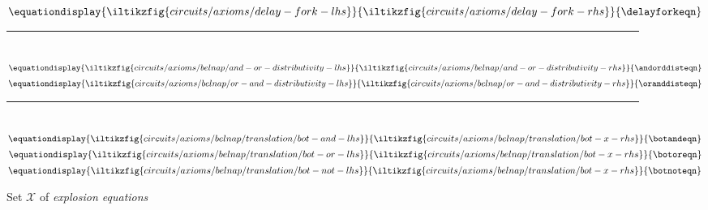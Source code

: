 \begin{figure*}
{    }{
        \oridemeqn
    }\)
    \quad
    \quad
    \(\equationdisplay{
        \iltikzfig{circuits/axioms/delay-fork-lhs}
    }{
        \iltikzfig{circuits/axioms/delay-fork-rhs}
    }{
        \delayforkeqn
    }\)
    \\[0.25em]
    \rule{\textwidth}{0.1mm}
    \\[0.6em]
    \(\equationdisplay{
        \iltikzfig{circuits/axioms/belnap/and-or-distributivity-lhs}
    }{
        \iltikzfig{circuits/axioms/belnap/and-or-distributivity-rhs}
    }{
        \andorddisteqn
    }\)
    \quad
    \(\equationdisplay{
        \iltikzfig{circuits/axioms/belnap/or-and-distributivity-lhs}
    }{
        \iltikzfig{circuits/axioms/belnap/or-and-distributivity-rhs}
    }{
        \oranddisteqn
    }\)
    \\[0.25em]
    \rule{\textwidth}{0.1mm}
    \\[0.6em]
    \(\equationdisplay{
        \iltikzfig{circuits/axioms/belnap/translation/bot-and-lhs}
    }{
        \iltikzfig{circuits/axioms/belnap/translation/bot-x-rhs}
    }{
        \botandeqn
    }\)
    \quad
    \(\equationdisplay{
        \iltikzfig{circuits/axioms/belnap/translation/bot-or-lhs}
    }{
        \iltikzfig{circuits/axioms/belnap/translation/bot-x-rhs}
    }{
        \botoreqn
    }\)
    \quad
    \(\equationdisplay{
        \iltikzfig{circuits/axioms/belnap/translation/bot-not-lhs}
    }{
        \iltikzfig{circuits/axioms/belnap/translation/bot-x-rhs}
    }{
        \botnoteqn
    }\)
    \\[0.6em]
    \caption{Set \(\mathcal{X}\) of \emph{explosion equations}}
    \label{fig:explosion-equations}
\end{figure*}